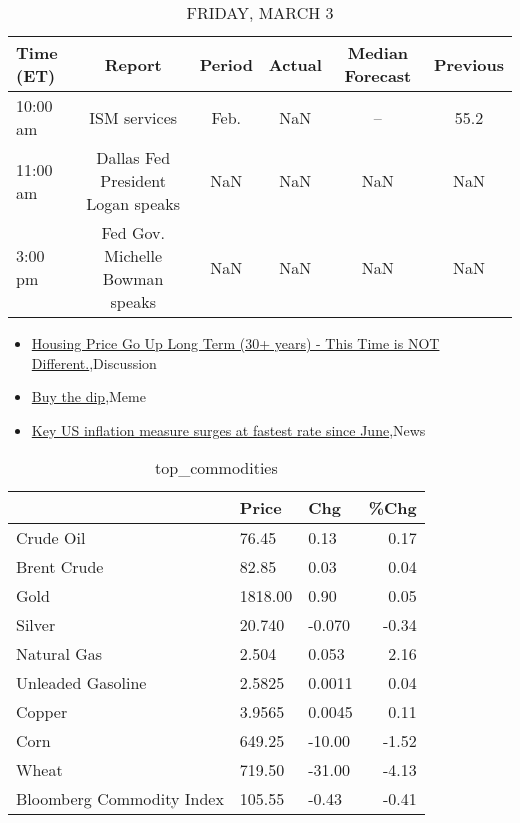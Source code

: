 \documentclass{article}%
\begin{document}
\begin{table}[htbp]%
\caption{FRIDAY, MARCH 3}%
\centering%
\begin{adjustbox}{width=1\textwidth}%
\begin{tabular}{lccccc}
\toprule
Time (ET) &                            Report & Period & Actual & Median Forecast & Previous \\
\midrule
 10:00 am &                      ISM services &   Feb. &    NaN &              -- &     55.2 \\
 11:00 am & Dallas Fed President Logan speaks &    NaN &    NaN &             NaN &      NaN \\
  3:00 pm &   Fed Gov. Michelle Bowman speaks &    NaN &    NaN &             NaN &      NaN \\
\bottomrule
\end{tabular}
%
\end{adjustbox}%
\end{table}

%
\begin{itemize}%
\item%
\href{https://reddit.com/r/wallstreetbets/comments/11beo3b/housing\_price\_go\_up\_long\_term\_30\_years\_this\_time/}{Housing Price Go Up Long Term (30+ years) - This Time is NOT Different.},Discussion%
\item%
\href{https://reddit.com/r/wallstreetbets/comments/11becvf/buy\_the\_dip/}{Buy the dip},Meme%
\item%
\href{https://reddit.com/r/Economics/comments/11bb9ph/key\_us\_inflation\_measure\_surges\_at\_fastest\_rate/}{Key US inflation measure surges at fastest rate since June},News%
\end{itemize}%


\begin{table}[htbp]%
\caption{top\_commodities}%
\centering%
\begin{adjustbox}{width=1\textwidth}%
\begin{tabular}{lllr}
\toprule
                          &   Price &    Chg &  \%Chg \\
\midrule
               Crude Oil  &   76.45 &   0.13 &  0.17 \\
             Brent Crude  &   82.85 &   0.03 &  0.04 \\
                    Gold  & 1818.00 &   0.90 &  0.05 \\
                  Silver  &  20.740 & -0.070 & -0.34 \\
             Natural Gas  &   2.504 &  0.053 &  2.16 \\
       Unleaded Gasoline  &  2.5825 & 0.0011 &  0.04 \\
                  Copper  &  3.9565 & 0.0045 &  0.11 \\
                    Corn  &  649.25 & -10.00 & -1.52 \\
                   Wheat  &  719.50 & -31.00 & -4.13 \\
Bloomberg Commodity Index &  105.55 &  -0.43 & -0.41 \\
\bottomrule
\end{tabular}
%
\end{adjustbox}%
\end{table}
\end{document}
